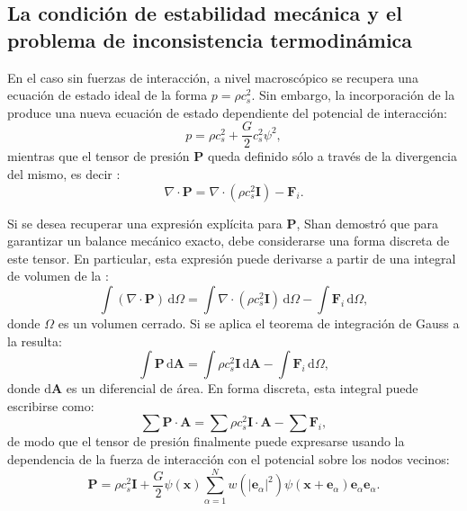 \subsection{La condici\'on de estabilidad mec\'anica y el problema de inconsistencia termodin\'amica}

En el caso sin fuerzas de interacci\'on, a nivel macrosc\'opico se recupera una ecuaci\'on de estado ideal de la forma $p=\rho c_s^2$. Sin embargo, la incorporaci\'on de la  produce una nueva ecuaci\'on de estado dependiente del potencial de interacci\'on:
\begin{equation}
	p = \rho c_s^2 + \dfrac{G}{2} c_s^2 \psi ^2,
\end{equation}
mientras que el tensor de presi\'on $\bm{P}$ queda definido s\'olo a trav\'es de la divergencia del mismo, es decir \cite{he_thermodynamic_2002}:
\begin{equation}
	\nabla \cdot \bm{P} = \nabla \cdot (\rho c_s^2 \bm{I}) - \bm{F}_i.
	\label{eq:ptens}
\end{equation}

Si se desea recuperar una expresi\'on expl\'icita para $\bm{P}$, Shan \cite{shan_pressure_2008} demostr\'o que para garantizar un balance mec\'anico exacto, debe considerarse una forma discreta de este tensor. En particular, esta expresi\'on puede derivarse a partir de una integral de volumen de la :
\begin{equation}
	\int (\nabla \cdot \bm{P}) \, \mbox{d}\Omega = \int \nabla \cdot (\rho c_s^2 \bm{I})\, \mbox{d}\Omega - \int \bm{F}_i \, \mbox{d}\Omega,
	\label{eq:integral_pres}
\end{equation}
donde $\Omega$ es un volumen cerrado. Si se aplica el teorema de integraci\'on de Gauss a la  resulta:
\begin{equation}
	\int \bm{P} \, \mbox{d} \bm{A} = \int \rho c_s^2 \bm{I}\, \mbox{d} \bm{A} - \int \bm{F}_i \, \mbox{d}\Omega,
\end{equation}
donde $\mbox{d} \bm{A}$ es un diferencial de \'area. En forma discreta, esta integral puede escribirse como:
\begin{equation}
	\sum \bm{P} \cdot \bm{A} = \sum \rho c_s^2 \bm{I} \cdot \bm{A} - \sum \bm{F}_i,
\end{equation}
de modo que el tensor de presi\'on finalmente puede expresarse usando la dependencia de la fuerza de interacci\'on con el potencial sobre los nodos vecinos:
\begin{equation}
	\bm{P} = \rho c_s^2 \bm{I} + \dfrac{G}{2}\psi(\bm{x}) \sum_{\alpha=1}^N w(|\bm{e}_{\alpha}|^2)\psi(\bm{x}+\bm{e}_{\alpha})\bm{e}_{\alpha}\bm{e}_{\alpha}.
	\label{eq:ptens_shan}
\end{equation}

